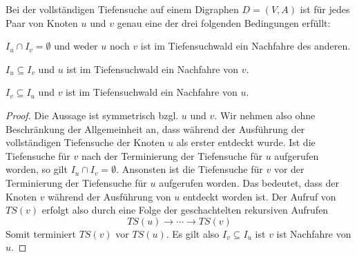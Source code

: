 \begin{thm}[Klammerungstheorem]
\label{thm:klammerung}
Bei der vollständigen Tiefensuche auf einem Digraphen $D=(V,A)$ ist für jedes Paar von Knoten $u$ und $v$ genau eine der drei folgenden Bedingungen erfüllt:
\begin{enuma}

 \item $I_u \cap I_v = \emptyset$  und weder $u$ noch $v$ ist im Tiefensuchwald ein Nachfahre des anderen.

 \item $I_u \subseteq I_v$ und $u$ ist im Tiefensuchwald ein Nachfahre von $v$.

 \item $I_v \subseteq I_u$ und $v$ ist im Tiefensuchwald ein Nachfahre von $u$.

\end{enuma}
\end{thm}
\begin{proof}
	Die Aussage ist symmetrisch bzgl. $u$ und $v$. Wir  nehmen also ohne Beschränkung der Allgemeinheit an, dass während der Ausführung der vollständigen Tiefensuche der Knoten $u$ als erster entdeckt wurde. Ist die Tiefensuche für $v$ nach der Terminierung der Tiefensuche für $u$ aufgerufen worden, so gilt $I_u \cap I_v = \emptyset$. Ansonsten ist die Tiefensuche für $v$ vor der Terminierung der Tiefensuche für $u$ aufgerufen worden. Das bedeutet, dass der Knoten $v$ während der Ausführung von $u$ entdeckt worden ist. Der Aufruf von $TS(v)$ erfolgt also durch eine Folge der geschachtelten rekursiven Aufrufen 
	\[
		TS(u) \xrightarrow{} \cdots \xrightarrow{} TS(v) 
	\] 
	Somit terminiert $TS(v)$ vor $TS(u)$. Es gilt also $I_v \subseteq I_u$ ist $v$ ist Nachfahre von $u$. 
\end{proof}


